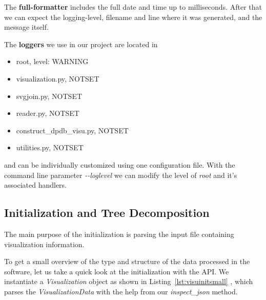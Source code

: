 \documentclass[a4paper, 12pt, bibliography=totoc]{scrartcl}
\begin{document}
The \textbf{full-formatter} includes the full date and time up to milliseconds. After that we can expect the logging-level, filename and line where it was generated, and the message itself.

The \textbf{loggers} we use in our project are located in 
\begin{itemize}
	\item root, level: WARNING
	\item visualization.py, NOTSET
	\item svgjoin.py, NOTSET
    \item reader.py, NOTSET
	\item construct\_dpdb\_visu.py, NOTSET
	\item utilities.py, NOTSET
\end{itemize}
and can be individually customized using one configuration file.
With the command line parameter \textit{-{}-loglevel} we can modify the level of \textit{root} and it's associated handlers.

\subsection{Initialization and Tree Decomposition}

The main purpose of the initialization is parsing the input file containing visualization information.

To get a small overview of the type and structure of the data processed in the software, let us take a quick look at the initialization with the API. We instantiate a \textit{Visualization} object as shown in Listing~\ref{lst:visuinitsmall} , which parses the \textit{VisualizationData} with the help from our \textit{inspect\_json} method. 

\end{document}
